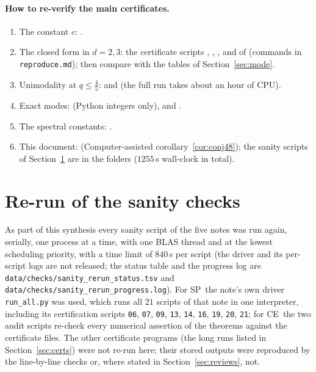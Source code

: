 \documentclass[10pt,a4paper]{article}
\theoremstyle{plain}
\theoremstyle{definition}
\newcommand{\SPE}{\textsf{SP}}
\newcommand{\CER}{\textsf{CE}}
\begin{document}
\paragraph{How to re-verify the main certificates.}
\begin{enumerate}
\item The constant $c$:  .
\item The closed form in $d=2,3$: the certificate scripts , , ,  and  of  (commands in \texttt{reproduce.md}); then compare  with the tables of Section~\ref{sec:mode}.
\item Unimodality at $q\le\frac45$:   and   (the full  run takes about an hour of CPU).
\item Exact modes:    (Python integers only), and  .
\item The spectral constants:  .
\item This document:   (Computer-assisted corollary~\ref{cor:conj48}); the sanity scripts of Section~\ref{sec:rerun} are in the  folders ($1255$\,s wall-clock in total).
\end{enumerate}

\section{Re-run of the sanity checks}\label{sec:rerun}

As part of this synthesis every sanity script of the five notes was run again, serially, one process at a time, with one BLAS thread and at the lowest scheduling priority, with a time limit of $840$\,s per script (the driver and its per-script logs are not released; the status table and the progress log are \texttt{data/checks/sanity\_rerun\_status.tsv} and \texttt{data/checks/sanity\_rerun\_progress.log}). For \SPE\ the note's own driver \texttt{run\_all.py} was used, which runs all $21$ scripts of that note in one interpreter, including its certification scripts \texttt{06}, \texttt{07}, \texttt{09}, \texttt{13}, \texttt{14}, \texttt{16}, \texttt{19}, \texttt{20}, \texttt{21}; for \CER\ the two audit scripts re-check every numerical assertion of the theorems against the certificate files. The other certificate programs (the long runs listed in Section~\ref{sec:certs}) were not re-run here; their stored outputs were reproduced by the line-by-line checks or, where stated in Section~\ref{sec:reviews}, not.
\end{document}
